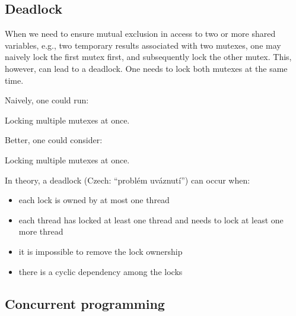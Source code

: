 \subsection{Deadlock}

When we need to ensure mutual exclusion in access to two or more shared variables, 
e.g., two temporary results associated with two mutexes, 
one may naively lock the first mutex first, and subsequently lock the other mutex. This, however, 
can lead to a deadlock. One needs to lock both mutexes at the same time.  

Naively, one could run:

\raggedbottom
\begin{codebox}[]{\href{https://godbolt.org/z/}{\ExternalLink}}
\footnotesize Locking multiple mutexes at once.
\tcblower
{}
\end{codebox}

Better, one could consider:

\raggedbottom
\begin{codebox}[]{\href{https://godbolt.org/z/}{\ExternalLink}}
\footnotesize Locking multiple mutexes at once.
\tcblower
{}
\end{codebox}

In theory, a deadlock (Czech: ``problém uváznutí'') can occur when:
\begin{itemize}
\item each lock is owned by at most one thread
\item each thread has locked at least one thread and needs to lock at least one more thread
\item it is impossible to remove the lock ownership
\item there is a cyclic dependency among the locks
\end{itemize}

\subsection{Concurrent programming}

